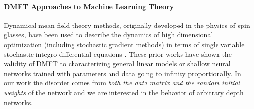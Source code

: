 \paragraph{DMFT Approaches to Machine Learning Theory} 
Dynamical mean field theory methods, originally developed in the physics of spin glasses, have been used to describe the dynamics of high dimensional optimization (including stochastic gradient methods) in terms of single variable stochastic integro-differential equations \cite{agoritsas2018out, mannelli2019passed, mignacco2020dynamical, mignacco2022effective, gerbelot2022rigorous, dandi2023how, bordelon2024dynamical, bordelon2024featurelearningimproveneural}. These prior works have shown the validity of DMFT to characterizing general linear models or shallow neural networks trained with parameters and data going to infinity proportionally. In our work the disorder comes from \textit{both the data matrix and the random initial weights} of the network and we are interested in the behavior of arbitrary depth networks. 

\vspace{-10pt}